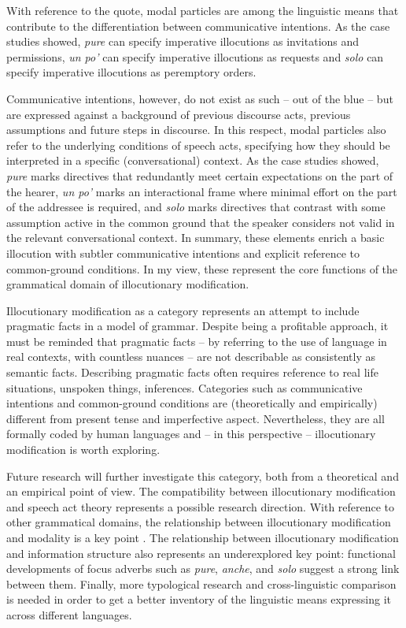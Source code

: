 With reference to the quote, modal particles are among the linguistic means that contribute to the differentiation between communicative intentions. As the case studies showed, \textit{pure} can specify imperative illocutions as invitations and permissions, \textit{un po’} can specify imperative illocutions as requests and \textit{solo} can specify imperative illocutions as peremptory orders.

Communicative intentions, however, do not exist as such – out of the blue – but are expressed against a background of previous discourse acts, previous assumptions and future steps in discourse. In this respect, modal particles also refer to the underlying conditions of speech acts, specifying how they should be interpreted in a specific (conversational) context. As the case studies showed, \textit{pure} marks directives that redundantly meet certain expectations on the part of the hearer, \textit{un po’} marks an interactional frame where minimal effort on the part of the addressee is required, and \textit{solo} marks directives that contrast with some assumption active in the common ground that the speaker considers not valid in the relevant conversational context. In summary, these elements enrich a basic illocution with subtler communicative intentions and explicit reference to common-ground conditions. In my view, these represent the core functions of the grammatical domain of illocutionary modification.

Illocutionary modification as a category represents an attempt to include pragmatic facts in a model of grammar. Despite being a profitable approach, it must be reminded that pragmatic facts – by referring to the use of language in real contexts, with countless nuances – are not describable as consistently as semantic facts. Describing pragmatic facts often requires reference to real life situations, unspoken things, inferences. Categories such as communicative intentions and common-ground conditions are (theoretically and empirically) different from present tense and imperfective aspect. Nevertheless, they are all formally coded by human languages and – in this perspective – illocutionary modification is worth exploring.

Future research will further investigate this category, both from a theoretical and an empirical point of view. The compatibility between illocutionary modification and speech act theory represents a possible research direction. With reference to other grammatical domains, the relationship between illocutionary modification and modality is a key point \citep{Narrog2012}. The relationship between illocutionary modification and information structure also represents an underexplored key point: functional developments of focus adverbs such as \textit{pure}, \textit{anche}, and \textit{solo} suggest a strong link between them. Finally, more typological research and cross-linguistic comparison is needed in order to get a better inventory of the linguistic means expressing it across different languages.

